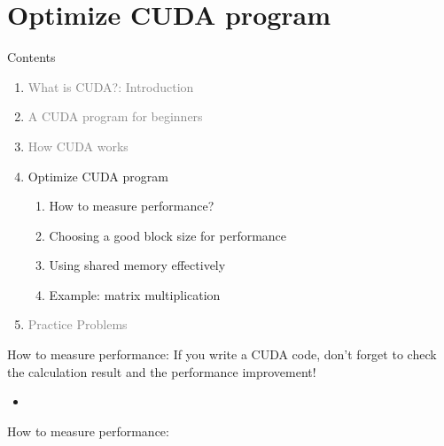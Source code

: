 \documentclass[dvipdfmx, 11pt, aspectratio=169]{beamer}   %
\begin{document}
\section{Optimize CUDA program}
\begin{frame}{Contents}
   \begin{enumerate}[<+->]   %
   \item \textcolor{gray}{What is CUDA?: Introduction}
   \item \textcolor{gray}{A CUDA program for beginners}
   \item \textcolor{gray}{How CUDA works}
   \item Optimize CUDA program
   \begin{enumerate}
     \item How to measure performance?
     \item Choosing a good block size for performance
     \item Using shared memory effectively
     \item Example: matrix multiplication
   \end{enumerate}
   \item \textcolor{gray}{Practice Problems}
 \end{enumerate}
\end{frame}
\begin{frame}{How to measure performance: }
If you write a CUDA code, don't forget to check the calculation result and the performance improvement!
\begin{itemize}
  \item 
\end{itemize}
\end{frame}
\begin{frame}{How to measure performance: }

\end{frame}
%
%
%
\end{document}
